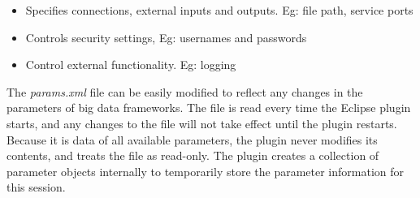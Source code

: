 \begin{itemize}
\item Specifies connections, external inputs and outputs. Eg: file path, service ports
\item Controls security settings, Eg: usernames and passwords
\item Control external functionality. Eg: logging
\end{itemize}
The \textit{params.xml} file can be easily modified to reflect any changes in the parameters of big data frameworks. The file is read every time the Eclipse plugin starts, and any changes to the file will not take effect until the plugin restarts. Because it is data of all available parameters, the plugin never modifies its contents, and treats the file as read-only. The plugin creates a collection of parameter objects internally to temporarily store the parameter information for this session.

\newpage
